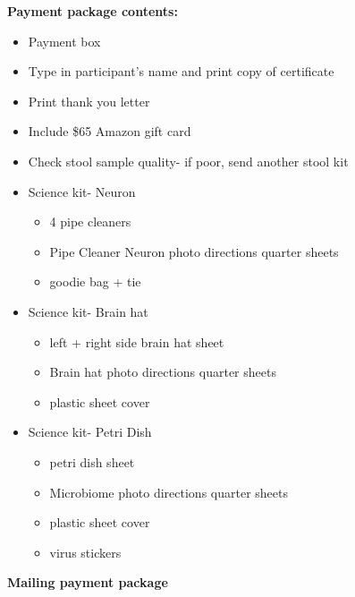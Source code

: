\documentclass[]{book}
\providecommand{\tightlist}{%
  \setlength{\itemsep}{0pt}\setlength{\parskip}{0pt}}
\begin{document}
\textbf{Payment package contents:}

\begin{itemize}
\tightlist
\item
  Payment box
\item
  Type in participant's name and print copy of certificate
\item
  Print thank you letter
\item
  Include \$65 Amazon gift card
\item
  Check stool sample quality- if poor, send another stool kit
\item
  Science kit- Neuron

  \begin{itemize}
  \tightlist
  \item
    4 pipe cleaners
  \item
    Pipe Cleaner Neuron photo directions quarter sheets
  \item
    goodie bag + tie
  \end{itemize}
\item
  Science kit- Brain hat

  \begin{itemize}
  \tightlist
  \item
    left + right side brain hat sheet
  \item
    Brain hat photo directions quarter sheets
  \item
    plastic sheet cover
  \end{itemize}
\item
  Science kit- Petri Dish

  \begin{itemize}
  \tightlist
  \item
    petri dish sheet
  \item
    Microbiome photo directions quarter sheets
  \item
    plastic sheet cover
  \item
    virus stickers
  \end{itemize}
\end{itemize}

\textbf{Mailing payment package}
\end{document}
